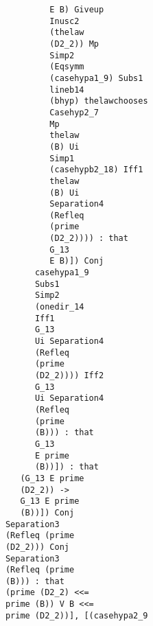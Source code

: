 \documentclass[12pt]{article}
\begin{document}
\begin{verbatim}
                                        E B) Giveup 
                                        Inusc2 
                                        (thelaw 
                                        (D2_2)) Mp 
                                        Simp2 
                                        (Eqsymm 
                                        (casehypa1_9) Subs1 
                                        lineb14 
                                        (bhyp) thelawchooses 
                                        Casehyp2_7 
                                        Mp 
                                        thelaw 
                                        (B) Ui 
                                        Simp1 
                                        (casehypb2_18) Iff1 
                                        thelaw 
                                        (B) Ui 
                                        Separation4 
                                        (Refleq 
                                        (prime 
                                        (D2_2)))) : that 
                                        G_13 
                                        E B)]) Conj 
                                     casehypa1_9 
                                     Subs1 
                                     Simp2 
                                     (onedir_14 
                                     Iff1 
                                     G_13 
                                     Ui Separation4 
                                     (Refleq 
                                     (prime 
                                     (D2_2)))) Iff2 
                                     G_13 
                                     Ui Separation4 
                                     (Refleq 
                                     (prime 
                                     (B))) : that 
                                     G_13 
                                     E prime 
                                     (B))]) : that 
                                  (G_13 E prime 
                                  (D2_2)) -> 
                                  G_13 E prime 
                                  (B))]) Conj 
                               Separation3 
                               (Refleq (prime 
                               (D2_2))) Conj 
                               Separation3 
                               (Refleq (prime 
                               (B))) : that 
                               (prime (D2_2) <<= 
                               prime (B)) V B <<= 
                               prime (D2_2))], [(casehypa2_9 

\end{verbatim}
\end{document}
